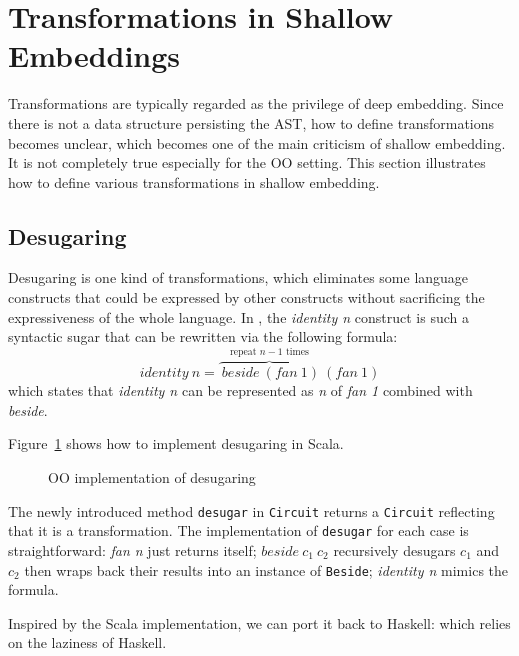 \section{Transformations in Shallow Embeddings}
Transformations are typically regarded as the privilege of deep embedding.
Since there is not a data structure persisting the AST, how to define transformations
becomes unclear, which becomes one of the main criticism of shallow embedding.
It is not completely true especially for the OO setting.
This section illustrates how to define various transformations in shallow embedding.

\subsection{Desugaring}
Desugaring is one kind of transformations, which eliminates some
language constructs that could be expressed by other constructs without
sacrificing the expressiveness of the whole language.
In \dsl, the \emph{identity n} construct is such a syntactic sugar that can
be rewritten via the following formula:
$$identity\ n = \overbrace{\ beside\ (fan\ 1)}^{\text{repeat }n-1\text{ times}}\ (fan\ 1)$$
which states that \emph{identity n} can be represented as \emph{n} of \emph{fan 1} combined with \emph{beside}.

Figure~\ref{code:desugar} shows how to implement desugaring in Scala.
\begin{figure}
\caption{OO implementation of desugaring}
\label{code:desugar}
\end{figure}
The newly introduced method \lstinline{desugar} in \lstinline{Circuit} returns a \lstinline{Circuit} reflecting that it is a transformation. The implementation of \lstinline{desugar} for each case is
straightforward: \emph{fan n} just returns itself; $beside\ c_1\ c_2$ recursively desugars $c_1$ and $c_2$ then wraps back
their results into an instance of \lstinline{Beside}; \emph{identity n} mimics the
formula.

Inspired by the Scala implementation, we can port it back to Haskell:
which relies on the laziness of Haskell.

